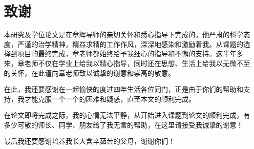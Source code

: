
\chapter*{致谢}
本研究及学位论文是在章辉导师的亲切关怀和悉心指导下完成的。他严肃的科学态度，严谨的治学精神，精益求精的工作作风，深深地感染和激励着我。从课题的选择到项目的最终完成，章老师都始终给予我细心的指导和不懈的支持。这半年多来，章老师不仅在学业上给我以精心指导，同时还在思想、生活上给我以无微不至的关怀，在此谨向章老师致以诚挚的谢意和崇高的敬意。

在此，我还要感谢在一起愉快的度过四年生活各位同门，正是由于你们的帮助和支持，我才能克服一个一个的困难和疑惑，直至本文的顺利完成。

在论文即将完成之际，我的心情无法平静，从开始进入课题到论文的顺利完成，有多少可敬的师长、同学、朋友给了我无言的帮助，在这里请接受我诚挚的谢意！

最后我还要感谢培养我长大含辛茹苦的父母，谢谢你们！